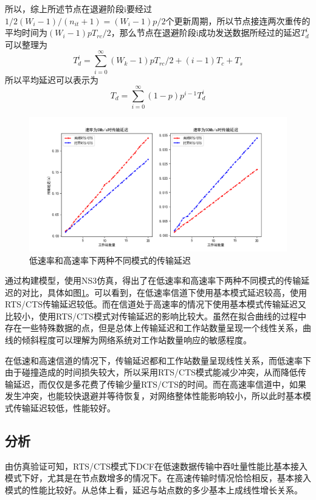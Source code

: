 \documentclass{article}
\begin{document}
所以，综上所述节点在退避阶段i要经过$1/2(W_{i}-1)/(n_{it}+1)=(W_{i}-1)p/2$个更新周期，所以节点接连两次重传的平均时间为$(W_{i}-1)pT_{rc}/2$，那么节点在退避阶段i成功发送数据所经过的延迟$T_{d}^{i}$可以整理为
\begin{equation}
T_{d}^{i}=\sum_{i=0}^{\infty}(W_{k}-1)pT_{rc}/2+(i-1)T_{c}+T_{s}
\end{equation}
所以平均延迟可以表示为
\begin{equation}
T_{d}=\sum_{i=0}^{\infty}(1-p)p^{i-1}T_{d}^{i}
\end{equation}

\begin{figure}[ht]
	\centering
	\includegraphics[scale=0.6]{picture/delay.png}
	\caption{低速率和高速率下两种不同模式的传输延迟}
	\label{fig:delay}
\end{figure}
通过构建模型，使用NS3仿真，得出了在低速率和高速率下两种不同模式的传输延迟的对比，具体如图\ref{fig:delay}。可以看到，在低速率信道下使用基本模式延迟较高，使用RTS/CTS传输延迟较低。而在信道处于高速率的情况下使用基本模式传输延迟又比较小，使用RTS/CTS模式对传输延迟的影响比较大。虽然在拟合曲线的过程中存在一些特殊数据的点，但是总体上传输延迟和工作站数量呈现一个线性关系，曲线的倾斜程度可以理解为网络系统对工作站数量响应的敏感程度。

在低速和高速信道的情况下，传输延迟都和工作站数量呈现线性关系，而低速率下由于碰撞造成的时间损失较大，所以采用RTS/CTS模式能减少冲突，从而降低传输延迟，而仅仅是多花费了传输少量RTS/CTS的时间。而在高速率信道中，如果发生冲突，也能较快退避并等待恢复，对网络整体性能影响较小，所以此时基本模式传输延迟较低，性能较好。
\subsection{分析}

由仿真验证可知，RTS/CTS模式下DCF在低速数据传输中吞吐量性能比基本接入模式下好，尤其是在节点数增多的情况下。在高速传输时情况恰恰相反，基本接入模式的性能比较好。从总体上看，延迟与站点数的多少基本上成线性增长关系。
\end{document}
